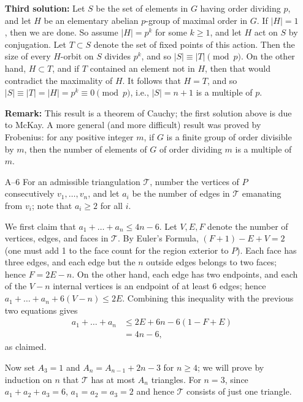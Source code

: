 \documentclass[amssymb,twocolumn,pra,10pt,aps]{revtex4-1}
\begin{document}
\begin{itemize}
\textbf{Third solution:}
Let $S$ be the set of elements in $G$ having order dividing $p$, and let
$H$ be an elementary abelian $p$-group of maximal order in $G$.  If
$|H|=1$, then we are done.  So assume $|H|=p^k$ for some $k\geq 1$, and
let $H$ act on $S$ by conjugation.  Let $T\subset S$ denote the set of
fixed points of this action.  Then the size of every $H$-orbit on $S$
divides $p^k$, and so $|S|\equiv |T| \pmod{p}$.
On the other hand, $H\subset T$, and if $T$ contained an element not in $H$,
then that would contradict the maximality of $H$.  It follows that
$H=T$, and so $|S|\equiv |T| = |H| = p^k \equiv 0 \pmod{p}$,
i.e., $|S|=n+1$ is a multiple of $p$.

\textbf{Remark:} This result is a theorem of Cauchy; the first solution
above is due to McKay. A more general (and more difficult) result was proved
by Frobenius: for any positive integer $m$, if $G$ is a finite group of order
divisible by $m$, then the number of elements of $G$ of order dividing $m$
is a multiple of $m$.

\item[A--6]
For an admissible triangulation $\mathcal{T}$, number the
  vertices of $P$ consecutively $v_1,\dots,v_n$, and let $a_i$ be the
  number of edges in $\mathcal{T}$ emanating from $v_i$; note that
  $a_i \geq 2$ for all $i$.

  We first claim that $a_1+\dots+a_n \leq 4n-6$. Let $V,E,F$ denote
  the number of vertices, edges, and faces in $\mathcal{T}$. By
  Euler's Formula, $(F+1)-E+V=2$ (one must add 1 to the face count for the
  region exterior to $P$). Each face has three edges, and each edge but the
  $n$ outside edges belongs to two faces; hence $F = 2E-n$. On the
  other hand, each edge has two endpoints, and each of the $V-n$
  internal vertices is an endpoint of at least $6$ edges; hence
  $a_1+\dots+a_n+6(V-n) \leq 2E$. Combining this inequality with the
  previous two equations gives
\begin{align*}
a_1+\dots+a_n &\leq 2E+6n-6(1-F+E) \\
&= 4n-6,
\end{align*}
as claimed.

Now set $A_3 = 1$ and $A_n = A_{n-1}+2n-3$ for $n \geq 4$; we will
prove by induction on $n$ that $\mathcal{T}$ has at most $A_n$
triangles. For $n=3$, since $a_1+a_2+a_3=6$, $a_1=a_2=a_3=2$ and hence
$\mathcal{T}$ consists of just one triangle.


\end{itemize}
\end{document}
